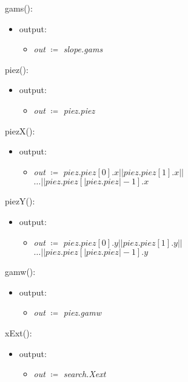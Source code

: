 \documentclass[12pt, titlepage]{article}
\begin{document}
\noindent gams():
\begin{itemize}
	\item output:
	\begin{itemize}
		\item[] \textit{out} $\coloneqq$ \textit{slope.gams}\\
	\end{itemize}
\end{itemize}

\noindent piez():
\begin{itemize}
	\item output:
	\begin{itemize}
		\item[] \textit{out} $\coloneqq$ \textit{piez.piez}\\
	\end{itemize}
\end{itemize}

\noindent piezX():
\begin{itemize}
	\item output:
	\begin{itemize}
		\item[] \textit{out} $\coloneqq$ $piez.piez[0].x || 
		piez.piez[1].x ||$\\$ \dots || piez.piez[| 
		piez.piez|-1].x$\\
	\end{itemize}
\end{itemize}

\noindent piezY():
\begin{itemize}
	\item output:
	\begin{itemize}
		\item[] \textit{out} $\coloneqq$ $piez.piez[0].y || 
		piez.piez[1].y ||$\\$ \dots || piez.piez[| 
		piez.piez|-1].y$\\
	\end{itemize}
\end{itemize}

\noindent gamw():
\begin{itemize}
	\item output:
	\begin{itemize}
		\item[] \textit{out} $\coloneqq$ \textit{piez.gamw}\\
	\end{itemize}
\end{itemize}

\noindent xExt():
\begin{itemize}
	\item output:
	\begin{itemize}
		\item[] \textit{out} $\coloneqq$ \textit{search.Xext}\\
	\end{itemize}
\end{itemize}
\end{document}
